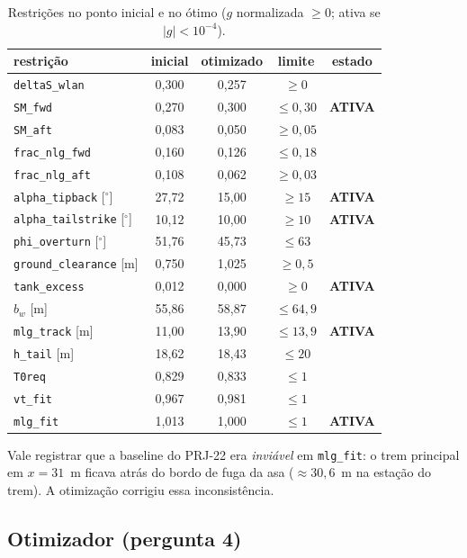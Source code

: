 \documentclass[11pt,a4paper]{article}
\begin{document}
\begin{table}[H]
\centering
\caption{Restrições no ponto inicial e no ótimo ($g$ normalizada $\ge 0$;
         ativa se $|g| < 10^{-4}$).}
\small
\begin{tabular}{lcccc}
\toprule
restrição & inicial & otimizado & limite & estado \\
\midrule
\texttt{deltaS\_wlan}      & 0{,}300 & 0{,}257 & $\ge 0$ & \\
\texttt{SM\_fwd}           & 0{,}270 & 0{,}300 & $\le 0{,}30$ & \textbf{ATIVA} \\
\texttt{SM\_aft}           & 0{,}083 & 0{,}050 & $\ge 0{,}05$ & \\
\texttt{frac\_nlg\_fwd}    & 0{,}160 & 0{,}126 & $\le 0{,}18$ & \\
\texttt{frac\_nlg\_aft}    & 0{,}108 & 0{,}062 & $\ge 0{,}03$ & \\
\texttt{alpha\_tipback} [$^\circ$]    & 27{,}72 & 15{,}00 & $\ge 15$ & \textbf{ATIVA} \\
\texttt{alpha\_tailstrike} [$^\circ$] & 10{,}12 & 10{,}00 & $\ge 10$ & \textbf{ATIVA} \\
\texttt{phi\_overturn} [$^\circ$]     & 51{,}76 & 45{,}73 & $\le 63$ & \\
\texttt{ground\_clearance} [m] & 0{,}750 & 1{,}025 & $\ge 0{,}5$ & \\
\texttt{tank\_excess}      & 0{,}012 & 0{,}000 & $\ge 0$ & \textbf{ATIVA} \\
$b_w$ [m]                  & 55{,}86 & 58{,}87 & $\le 64{,}9$ & \\
\texttt{mlg\_track} [m]    & 11{,}00 & 13{,}90 & $\le 13{,}9$ & \textbf{ATIVA} \\
\texttt{h\_tail} [m]       & 18{,}62 & 18{,}43 & $\le 20$ & \\
\texttt{T0req}             & 0{,}829 & 0{,}833 & $\le 1$ & \\
\texttt{vt\_fit}           & 0{,}967 & 0{,}981 & $\le 1$ & \\
\texttt{mlg\_fit}          & 1{,}013 & 1{,}000 & $\le 1$ & \textbf{ATIVA} \\
\bottomrule
\end{tabular}
\end{table}

Vale registrar que a baseline do PRJ-22 era \emph{inviável} em
\texttt{mlg\_fit}: o trem principal em $x = 31$~m ficava atrás do bordo de
fuga da asa ($\approx 30{,}6$~m na estação do trem). A otimização corrigiu
essa inconsistência.

\subsection{Otimizador (pergunta 4)}
\end{document}
